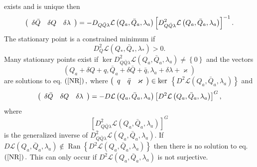 \documentclass[aps,preprint]{revtex4}%
\begin{document}
exists and is unique then
\begin{equation}
\left(
\begin{array}
[c]{ccc}%
\delta\bar{Q} & \delta Q & \delta\lambda
\end{array}
\right)  =-D_{Q\bar{Q}\lambda}\mathcal{L}\left(  Q_{a},\bar{Q}_{a},\lambda
_{a}\right)  \left[  D_{Q\bar{Q}\lambda}^{2}\mathcal{L}\left(  Q_{a},\bar
{Q}_{a},\lambda_{a}\right)  \right]  ^{-1}.
\end{equation}
The stationary point is a constrained minimum if
\begin{equation}
D_{Q}^{2}\mathcal{L}\left(  Q_{\ast},\bar{Q}_{\ast},\lambda_{\ast}\right)  >0.
\end{equation}
Many stationary points exist if $\ker D_{Q\bar{Q}\lambda}^{2}\mathcal{L}%
\left(  Q_{a},\bar{Q}_{a},\lambda_{a}\right)  \neq\left\{  0\right\}  $ and
the vectors
\begin{equation}
\left(  Q_{a}+\delta Q+q,\bar{Q}_{a}+\delta\bar{Q}+\bar{q},\lambda_{a}%
+\delta\lambda+\varkappa\right)
\end{equation}
are solutions to eq. $\left(  \ref{NR}\right)  ,$ where $\left(
\begin{array}
[c]{ccc}%
q & \bar{q} & \varkappa
\end{array}
\right)  \in\ker$ $\left\{  D^{2}\mathcal{L}\left(  Q_{a},\bar{Q}_{a}%
,\lambda_{a}\right)  \right\}  $ and
\begin{equation}
\left(
\begin{array}
[c]{ccc}%
\delta\bar{Q} & \delta Q & \delta\lambda
\end{array}
\right)  =-D\mathcal{L}\left(  Q_{a},\bar{Q}_{a},\lambda_{a}\right)  \left[
D^{2}\mathcal{L}\left(  Q_{a},\bar{Q}_{a},\lambda_{a}\right)  \right]  ^{G},
\end{equation}
where
\begin{equation}
\left[  D_{Q\bar{Q}\lambda}^{2}\mathcal{L}\left(  Q_{a},\bar{Q}_{a}%
,\lambda_{a}\right)  \right]  ^{G}%
\end{equation}
is the generalized inverse of $D_{Q\bar{Q}\lambda}^{2}\mathcal{L}\left(
Q_{a},\bar{Q}_{a},\lambda_{a}\right)  .$ If $D\mathcal{L}\left(  Q_{a},\bar
{Q}_{a},\lambda_{a}\right)  \notin\operatorname{Ran}\left\{  D^{2}%
\mathcal{L}\left(  Q_{a},\bar{Q}_{a},\lambda_{a}\right)  \right\}  $ then
there is no solution to eq. $\left(  \ref{NR}\right)  .$ This can only occur
if $D^{2}\mathcal{L}\left(  Q_{a},\bar{Q}_{a},\lambda_{a}\right)  $ is not surjective.
\end{document}
